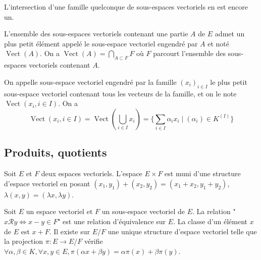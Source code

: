 \begin{rem}
L'intersection d'une famille quelconque de sous-espaces vectoriels en est encore un.
\end{rem}

\begin{de}
L'ensemble des sous-espaces vectoriels contenant une partie $A$ de $E$ admet un plus petit élément appelé le sous-espace vectoriel engendré par $A$ et noté $\operatorname{Vect}(A)$. On a $\operatorname{Vect}(A) = \bigcap_{A \subset F} F$ où $F$ parcourt l'ensemble des sous-espaces vectoriels contenant $A$.
\end{de}

\begin{de}
On appelle sous-espace vectoriel engendré par la famille $(x_i)_{i\in I}$ le plus petit sous-espace vectoriel contenant tous les vecteurs de la famille, et on le note $\operatorname{Vect}(x_i,i \in I)$. On a
\[ \operatorname{Vect}(x_i,i \in I) = \operatorname{Vect}(\bigcup_{i \in I} x_i) = \{\sum_{i\in I} \alpha_i x_i \mid (\alpha_i) \in K^{(I)}\} \]
\end{de}

\subsection{Produits, quotients}

\begin{de}
Soit $E$ et $F$ deux espaces vectoriels. L'espace $E \times F$ est muni d'une structure d'espace vectoriel en posant $(x_1,y_1) + (x_2,y_2) = (x_1 + x_2,y_1 + y_2)$, $\lambda(x,y) = (\lambda x,\lambda y)$.
\end{de}

\begin{de}
Soit $E$ un espace vectoriel et $F$ un sous-espace vectoriel de $E$. La relation "$x\mathcal{R}y \Leftrightarrow x - y \in F$" est une relation d'équivalence sur $E$. La classe d'un élément $x$ de $E$ est $x + F$. Il existe sur $E/F$ une unique structure d'espace vectoriel telle que la projection $\pi : E \to E/F$ vérifie $\forall \alpha,\beta \in K, \forall x,y \in E, \pi(\alpha x + \beta y) = \alpha\pi(x) + \beta\pi(y)$.
\end{de}


